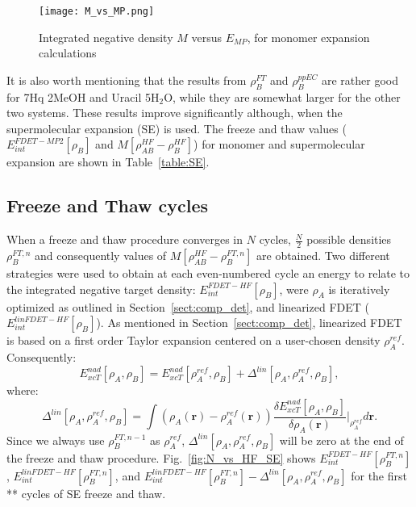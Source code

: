 \documentclass[journal=jctcce,manuscript=article, layout=twocolumn]{achemso}
\begin{document}
\begin{figure}[H]
\centering
\texttt{[image: M\_vs\_MP.png]}
\caption{Integrated negative density $M$ versus $E_{MP}$, for monomer expansion calculations}
\label{fig:M_vs_MP}
\end{figure}

It is also worth mentioning that the results from $\rho_B^{FT}$ and $\rho_B^{ppEC}$ are rather good for 7Hq 2MeOH and Uracil 5H$_2$O, while they are somewhat larger for the other two systems. These results improve significantly although, when the supermolecular expansion (SE) is used. The freeze and thaw values ($E^{FDET-MP2}_{int}[\rho_B]$ and $M[\rho^{HF}_{AB} - \rho^{HF}_{B}]$) for monomer and supermolecular expansion are shown in Table~\ref{table:SE}.

\subsection{Freeze and Thaw cycles}
When a freeze and thaw procedure converges in $N$ cycles, $\frac{N}{2}$ possible densities $\rho_B^{FT,n}$ and consequently values of $M[\rho^{HF}_{AB} - \rho^{FT,n}_{B}]$ are obtained.
Two different strategies were used to obtain at each even-numbered cycle an energy to relate to the integrated negative target density: $E^{FDET-HF}_{int}[\rho_B]$, were $\rho_A$ is iteratively optimized as outlined in Section~\ref{sect:comp_det}, and linearized FDET ($E^{linFDET-HF}_{int}[\rho_B]$). 
As mentioned in Section~\ref{sect:comp_det}, linearized FDET is based on a first order Taylor expansion centered on a user-chosen density $\rho_A^{ref}$. Consequently:
\begin{equation}
 E_{xcT}^{nad}[\rho_A,\rho_B] = E_{xcT}^{nad}[\rho_A^{ref},\rho_B] + \Delta^{lin}[\rho_A,\rho_A^{ref},\rho_B],
\end{equation}
where:
\begin{equation}
 \Delta^{lin}[\rho_A,\rho_A^{ref},\rho_B]  = \int \left( \rho_A(\mathbf{r}) -  \rho_A^{ref}(\mathbf{r}) \right) \frac{\delta E_{xcT}^{nad}[\rho_A, \rho_B]}{\delta \rho_A(\mathbf{r})}
 \Bigg \vert_{\rho_A^{ref}}
 d\mathbf{r}.
\end{equation}
Since we always use $\rho_B^{FT,n-1}$ as $\rho_A^{ref}$, $\Delta^{lin}[\rho_A,\rho_A^{ref},\rho_B]$ will be zero at the end of the freeze and thaw procedure.
Fig.~\ref{fig:N_vs_HF_SE} shows $E^{FDET-HF}_{int}[\rho_B^{FT,n}]$,  $E^{linFDET-HF}_{int}[\rho_B^{FT,n}]$, and $E^{linFDET-HF}_{int}[\rho_B^{FT,n}] - \Delta^{lin}[\rho_A,\rho_A^{ref},\rho_B]$ for the first ** cycles of SE freeze and thaw.
\end{document}
